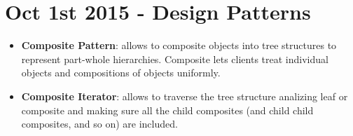 \section{Oct 1st 2015 - Design Patterns}

\begin{itemize}
\item \textbf{Composite Pattern}: allows to composite objects into
  tree structures to represent part-whole hierarchies. Composite lets
  clients treat individual objects and compositions of objects
  uniformly.
\item \textbf{Composite Iterator}: allows to traverse the tree
  structure analizing leaf or composite and making sure all the child
  composites (and child child composites, and so on) are included.
\end{itemize}